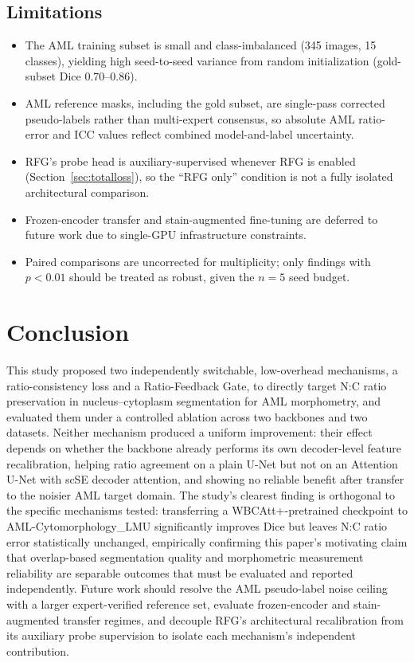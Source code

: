 \documentclass[pdflatex,sn-mathphys-num]{sn-jnl}%
\theoremstyle{thmstyleone}%
\theoremstyle{thmstyletwo}%
\theoremstyle{thmstylethree}%
\begin{document}
\subsection{Limitations}
\label{sec:limitations}

\begin{itemize}
\item The AML training subset is small and class-imbalanced (345 images, 15 classes), yielding high seed-to-seed variance from random initialization (gold-subset Dice 0.70--0.86).
\item AML reference masks, including the gold subset, are single-pass corrected pseudo-labels rather than multi-expert consensus, so absolute AML ratio-error and ICC values reflect combined model-and-label uncertainty.
\item RFG's probe head is auxiliary-supervised whenever RFG is enabled (Section~\ref{sec:totalloss}), so the ``RFG only'' condition is not a fully isolated architectural comparison.
\item Frozen-encoder transfer and stain-augmented fine-tuning are deferred to future work due to single-GPU infrastructure constraints.
\item Paired comparisons are uncorrected for multiplicity; only findings with $p<0.01$ should be treated as robust, given the $n=5$ seed budget.
\end{itemize}


\section{Conclusion} \label{sec:conclusion}

This study proposed two independently switchable, low-overhead mechanisms, a ratio-consistency loss and a Ratio-Feedback Gate, to directly target N:C ratio preservation in nucleus--cytoplasm segmentation for AML morphometry, and evaluated them under a controlled ablation across two backbones and two datasets. Neither mechanism produced a uniform improvement: their effect depends on whether the backbone already performs its own decoder-level feature recalibration, helping ratio agreement on a plain U-Net but not on an Attention U-Net with scSE decoder attention, and showing no reliable benefit after transfer to the noisier AML target domain. The study's clearest finding is orthogonal to the specific mechanisms tested: transferring a WBCAtt+-pretrained checkpoint to AML-Cytomorphology\_LMU significantly improves Dice but leaves N:C ratio error statistically unchanged, empirically confirming this paper's motivating claim that overlap-based segmentation quality and morphometric measurement reliability are separable outcomes that must be evaluated and reported independently. Future work should resolve the AML pseudo-label noise ceiling with a larger expert-verified reference set, evaluate frozen-encoder and stain-augmented transfer regimes, and decouple RFG's architectural recalibration from its auxiliary probe supervision to isolate each mechanism's independent contribution.
\end{document}
